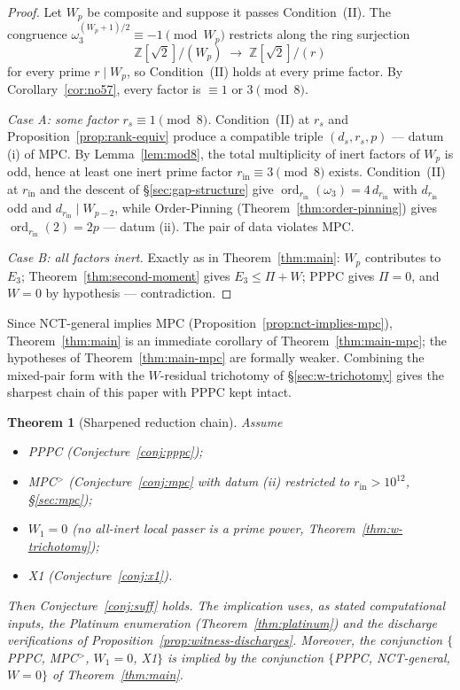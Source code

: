 \documentclass[11pt]{amsart}
\theoremstyle{plain}
\newtheorem{theorem}{Theorem}[section]
\theoremstyle{definition}
\theoremstyle{remark}
\numberwithin{equation}{section}
\newcommand{\ord}{\operatorname{ord}}
\newcommand{\Z}{\mathbb{Z}}
\begin{document}
\begin{proof}
Let $W_p$ be composite and suppose it passes Condition~(II). The congruence $\omega_3^{(W_p+1)/2} \equiv -1 \pmod{W_p}$ restricts along the ring surjection
\[
  \Z[\sqrt 2]/(W_p) \;\longrightarrow\; \Z[\sqrt 2]/(r)
\]
for every prime $r \mid W_p$, so Condition~(II) holds at every prime factor. By Corollary~\ref{cor:no57}, every factor is $\equiv 1$ or $3 \pmod 8$.

\emph{Case A: some factor $r_s \equiv 1 \pmod 8$.} Condition~(II) at $r_s$ and Proposition~\ref{prop:rank-equiv} produce a compatible triple $(d_s, r_s, p)$ --- datum (i) of MPC. By Lemma~\ref{lem:mod8}, the total multiplicity of inert factors of $W_p$ is odd, hence at least one inert prime factor $r_{\mathrm{in}} \equiv 3 \pmod 8$ exists. Condition~(II) at $r_{\mathrm{in}}$ and the descent of \S\ref{sec:gap-structure} give $\ord_{r_{\mathrm{in}}}(\omega_3) = 4\,d_{r_{\mathrm{in}}}$ with $d_{r_{\mathrm{in}}}$ odd and $d_{r_{\mathrm{in}}} \mid W_{p-2}$, while Order-Pinning (Theorem~\ref{thm:order-pinning}) gives $\ord_{r_{\mathrm{in}}}(2) = 2p$ --- datum (ii). The pair of data violates MPC.

\emph{Case B: all factors inert.} Exactly as in Theorem~\ref{thm:main}: $W_p$ contributes to $E_3$; Theorem~\ref{thm:second-moment} gives $E_3 \leq \Pi + W$; PPPC gives $\Pi = 0$, and $W = 0$ by hypothesis --- contradiction.
\end{proof}

Since NCT-general implies MPC (Proposition~\ref{prop:nct-implies-mpc}), Theorem~\ref{thm:main} is an immediate corollary of Theorem~\ref{thm:main-mpc}; the hypotheses of Theorem~\ref{thm:main-mpc} are formally weaker. Combining the mixed-pair form with the $W$-residual trichotomy of \S\ref{sec:w-trichotomy} gives the sharpest chain of this paper with PPPC kept intact.

\begin{theorem}[Sharpened reduction chain]\label{thm:sharpened-chain}
Assume
\begin{itemize}
\item PPPC (Conjecture~\ref{conj:pppc});
\item MPC$^{>}$ (Conjecture~\ref{conj:mpc} with datum (ii) restricted to $r_{\mathrm{in}} > 10^{12}$, \S\ref{sec:mpc});
\item $W_1 = 0$ (no all-inert local passer is a prime power, Theorem~\ref{thm:w-trichotomy});
\item X1 (Conjecture~\ref{conj:x1}).
\end{itemize}
Then Conjecture~\ref{conj:suff} holds. The implication uses, as stated computational inputs, the Platinum enumeration (Theorem~\ref{thm:platinum}) and the discharge verifications of Proposition~\ref{prop:witness-discharges}. Moreover, the conjunction $\{$PPPC, MPC$^{>}$, $W_1 = 0$, X1$\}$ is implied by the conjunction $\{$PPPC, NCT-general, $W = 0\}$ of Theorem~\ref{thm:main}.
\end{theorem}
\end{document}
